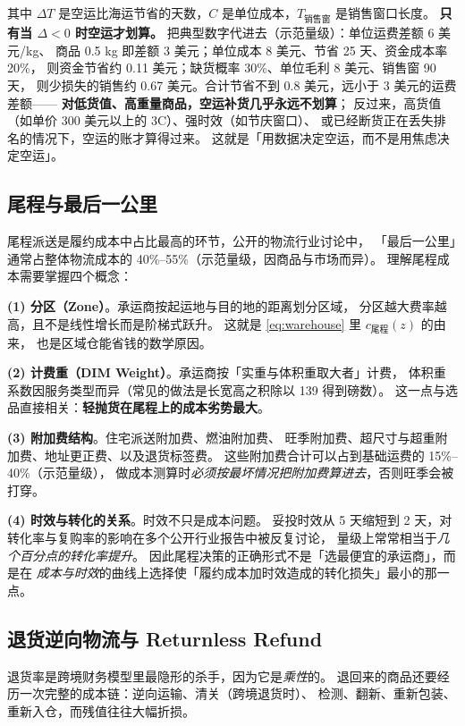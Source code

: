 其中 $\Delta T$ 是空运比海运节省的天数，$C$ 是单位成本，$T_{\text{销售窗}}$ 是销售窗口长度。
\textbf{只有当 $\Delta < 0$ 时空运才划算。}
把典型数字代进去（示范量级）：单位运费差额 6 美元/kg、
商品 0.5 kg 即差额 3 美元；单位成本 8 美元、节省 25 天、资金成本率 20\%，
则资金节省约 0.11 美元；缺货概率 30\%、单位毛利 8 美元、销售窗 90 天，
则少损失的销售约 0.67 美元。合计节省不到 0.8 美元，远小于 3 美元的运费差额——
\textbf{对低货值、高重量商品，空运补货几乎永远不划算}；
反过来，高货值（如单价 300 美元以上的 3C）、强时效（如节庆窗口）、
或已经断货正在丢失排名的情况下，空运的账才算得过来。
这就是「用数据决定空运，而不是用焦虑决定空运」。

\subsection{尾程与最后一公里}

尾程派送是履约成本中占比最高的环节，公开的物流行业讨论中，
「最后一公里」通常占整体物流成本的 40\%--55\%（示范量级，因商品与市场而异）。
理解尾程成本需要掌握四个概念：

\textbf{(1) 分区（Zone）}。承运商按起运地与目的地的距离划分区域，
分区越大费率越高，且不是线性增长而是阶梯式跃升。
这就是 \cref{eq:warehouse} 里 $c_{\text{尾程}}(z)$ 的由来，
也是区域仓能省钱的数学原因。

\textbf{(2) 计费重（DIM Weight）}。承运商按「实重与体积重取大者」计费，
体积重系数因服务类型而异（常见的做法是长宽高之积除以 139 得到磅数）。
这一点与选品直接相关：\textbf{轻抛货在尾程上的成本劣势最大}。

\textbf{(3) 附加费结构}。住宅派送附加费、燃油附加费、
旺季附加费、超尺寸与超重附加费、地址更正费、以及退货标签费。
这些附加费合计可以占到基础运费的 15\%--40\%（示范量级），
做成本测算时\emph{必须按最坏情况把附加费算进去}，否则旺季会被打穿。

\textbf{(4) 时效与转化的关系}。时效不只是成本问题。
妥投时效从 5 天缩短到 2 天，对转化率与复购率的影响在多个公开行业报告中被反复讨论，
量级上常常相当于\emph{几个百分点的转化率提升}。
因此尾程决策的正确形式不是「选最便宜的承运商」，而是在
\emph{成本与时效}的曲线上选择使「履约成本加时效造成的转化损失」最小的那一点。

\subsection{退货逆向物流与 Returnless Refund}

退货率是跨境财务模型里最隐形的杀手，因为它是\emph{乘性}的。
退回来的商品还要经历一次完整的成本链：逆向运输、清关（跨境退货时）、
检测、翻新、重新包装、重新入仓，而残值往往大幅折损。


